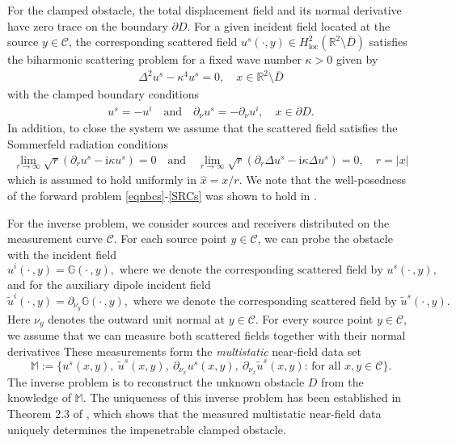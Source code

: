 \documentclass{article}
\begin{document}
For the clamped obstacle, the total displacement field and its normal derivative have zero trace on the boundary $\partial D$.
For a given incident field located at the source $y \in \mathcal{C}$, the corresponding scattered field $u^{s}(\cdot , y)\in H_{\text{loc}}^2(\mathbb R^2\setminus\overline D)$ satisfies the biharmonic scattering problem for a fixed wave number $\kappa>0$ given by
\begin{align}\label{eqnbcs}
    \Delta^2u^s-\kappa^4u^s=0,\quad x\in\mathbb R^2\setminus\overline D
\end{align}
with the clamped boundary conditions
\begin{align}\label{bcs}
    u^s=-u^i\quad \text{and}\quad \partial_\nu u^s=-\partial_\nu u^i,\quad x\in\partial D.
\end{align}
In addition, to close the system we assume that the scattered field satisfies the Sommerfeld radiation conditions
\begin{align}\label{SRCs}
    \lim_{r\to\infty} \sqrt{r}(\partial_r u^s-\mathrm{i}\kappa u^s)=0\quad \text{and}\quad \lim_{r\to\infty} \sqrt{r}(\partial_r \Delta u^s-\mathrm{i}\kappa \Delta u^s)=0, \quad r=|x|
\end{align}
which is assumed to hold uniformly in $\hat x=x/r$. We note that the well-posedness of the forward problem \eqref{eqnbcs}-\eqref{SRCs} was shown to hold in \cite{BourgeoisHazard2020}. 

{For the inverse problem, we consider sources and receivers distributed on the measurement curve $\mathcal C$. For each source point $y \in \mathcal C$, we can probe the obstacle with the incident field
\[
u^{i}(\cdot \, , y) = \mathbb{G}(\cdot \, , y), \,\,\text{where we denote the corresponding scattered field by } u^{s}(\cdot \, , y),
\]
and for the auxiliary dipole incident field
\[
\tilde{u}^{i}(\cdot \, , y) = \partial_{\nu_y}\mathbb{G}(\cdot \, , y), \,\, \text{where we denote the corresponding scattered field by } \tilde{u}^{s}(\cdot \, , y).
\]
Here $\nu_y$ denotes the outward unit normal at $y \in \mathcal C$.} 
For every source point $y \in \mathcal C$, we assume that we can measure both scattered fields together with their normal derivatives
%
These measurements form the \emph{multistatic} near-field data set
\begin{equation}\label{NF_dataset}
\mathbb M :=
\Big\{
u^{s}(x,y), \ \tilde u^{s}(x,y), \ \partial_{\nu_x}u^{s}(x,y), \ \partial_{\nu_x}\tilde u^{s}(x,y)
:\, \text{for all} \, \, x,y \in \mathcal C
\Big\}.
\end{equation}
The inverse problem is to reconstruct the unknown obstacle $D$ from the knowledge of $\mathbb M$. 
The uniqueness of this inverse problem has been established in Theorem 2.3 of \cite{BourgeoisRecoquillay2020}, which shows that the measured multistatic near-field data uniquely determines the impenetrable clamped obstacle.
\end{document}
